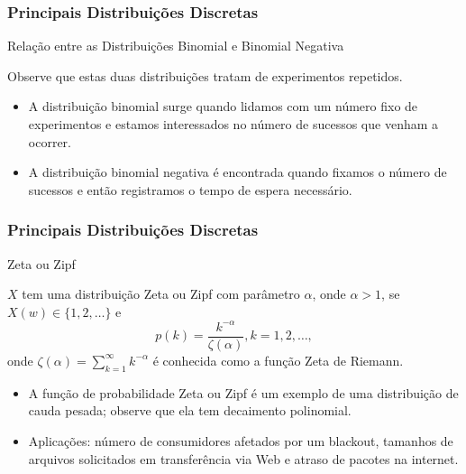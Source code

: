 \begin{frame}
\frametitle{\textbf{Principais Distribuições Discretas}}
\baselineskip=13pt
\begin{block}{Relação entre as Distribuições Binomial e Binomial Negativa}


Observe que estas duas distribuições tratam de experimentos
repetidos.
\begin{itemize}
\item A distribuição binomial surge quando lidamos com um
número fixo de experimentos e estamos interessados no número de sucessos
que venham a ocorrer.
\item A distribuição binomial negativa é encontrada
quando fixamos o número de sucessos e então registramos o tempo de
espera necessário.
\end{itemize}

\end{block}
\end{frame}
%
\begin{frame}
\frametitle{\textbf{Principais Distribuições Discretas}}
\baselineskip=13pt
\begin{block}{Zeta ou Zipf}

$X$ tem uma distribuição Zeta
ou Zipf com parâmetro $\alpha$, onde $\alpha>1$, se
$X(w)\in\{1,2,\ldots\}$ e
$$p(k)=\frac{k^{-\alpha}}{\zeta(\alpha)},k=1,2,\ldots,$$
onde $\zeta(\alpha)=\sum_{k=1}^{\infty}k^{-\alpha}$ é conhecida como
a função Zeta de Riemann.

\begin{itemize}
\item A função de probabilidade Zeta ou Zipf é um exemplo de uma
distribuição de cauda pesada; observe que ela tem decaimento polinomial.

\item Aplicações: número de consumidores afetados por um blackout, tamanhos
de arquivos solicitados em transferência via Web e atraso de pacotes
na internet.
\end{itemize}

\end{block}
\end{frame}
%
